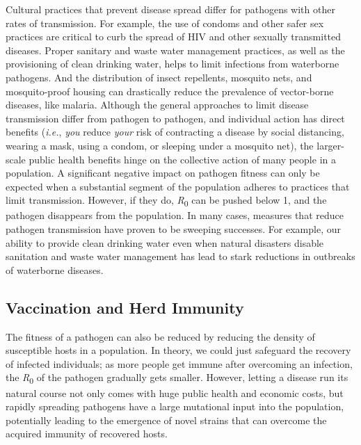 \documentclass[
]{book}
\begin{document}
Cultural practices that prevent disease spread differ for pathogens with other rates of transmission. For example, the use of condoms and other safer sex practices are critical to curb the spread of HIV and other sexually transmitted diseases. Proper sanitary and waste water management practices, as well as the provisioning of clean drinking water, helps to limit infections from waterborne pathogens. And the distribution of insect repellents, mosquito nets, and mosquito-proof housing can drastically reduce the prevalence of vector-borne diseases, like malaria. Although the general approaches to limit disease transmission differ from pathogen to pathogen, and individual action has direct benefits (\emph{i.e.}, \emph{you} reduce \emph{your} risk of contracting a disease by social distancing, wearing a mask, using a condom, or sleeping under a mosquito net), the larger-scale public health benefits hinge on the collective action of many people in a population. A significant negative impact on pathogen fitness can only be expected when a substantial segment of the population adheres to practices that limit transmission. However, if they do, \emph{R}\textsubscript{0} can be pushed below 1, and the pathogen disappears from the population. In many cases, measures that reduce pathogen transmission have proven to be sweeping successes. For example, our ability to provide clean drinking water even when natural disasters disable sanitation and waste water management has lead to stark reductions in outbreaks of waterborne diseases.

\hypertarget{vaccination-and-herd-immunity}{%
\subsection{Vaccination and Herd Immunity}\label{vaccination-and-herd-immunity}}

The fitness of a pathogen can also be reduced by reducing the density of susceptible hosts in a population. In theory, we could just safeguard the recovery of infected individuals; as more people get immune after overcoming an infection, the \emph{R}\textsubscript{0} of the pathogen gradually gets smaller. However, letting a disease run its natural course not only comes with huge public health and economic costs, but rapidly spreading pathogens have a large mutational input into the population, potentially leading to the emergence of novel strains that can overcome the acquired immunity of recovered hosts.
\end{document}
